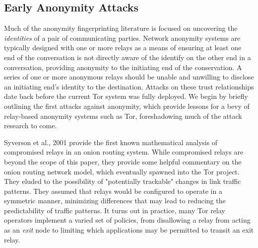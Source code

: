 \documentclass[sigconf]{acmart}
\begin{document}
\subsection{Early Anonymity Attacks}\label{subsec:early_anonymity_attacks}

Much of the anonymity fingerprinting literature is focused on uncovering
the \emph{identities} of a pair of communicating parties.  Network
anonymity systems are typically designed with one or more relays as a
means of ensuring at least one end of the conversation is not directly
aware of the identify on the other end in a conversation, providing
anonymity to the initiating end of the conservation.  A series of one or
more anonymous relays should be unable and unwilling to disclose an
initiating end's identity to the destination.  Attacks on these trust
relationships date back before the current Tor system was fully
deployed.  We begin by briefly outlining the first attacks against
anonymity, which provide lessons for a bevy of relay-based anonymity
systems such as Tor, foreshadowing much of the attack research to come.

Syverson et al., 2001 \cite{syverson_towards_2001} provide the first
known mathematical analysis of compromised relays in an onion routing
system.  While compromised relays are beyond the scope of this paper,
they provide some helpful commentary on the onion routing network model,
which eventually spawned into the Tor project.  They eluded to the
possibility of "potentially trackable" changes in link traffic patterns.
They assumed that relays would be configured to operate in a symmetric
manner, minimizing differences that may lead to reducing the
predictability of traffic patterns.  It turns out in practice, many Tor
relay operators implement a varied set of policies, from disallowing a
relay from acting as an \emph{exit} node to limiting which applications
may be permitted to transit an exit relay.
\end{document}
